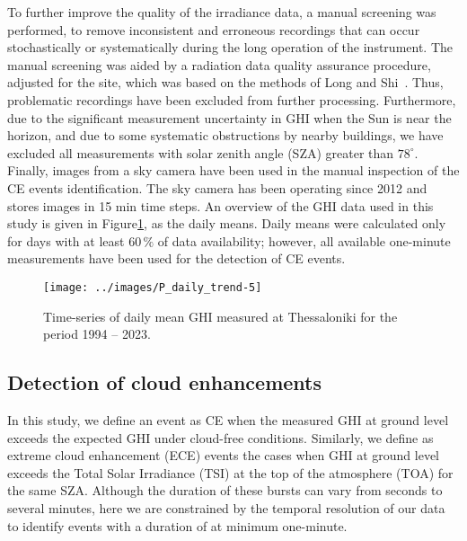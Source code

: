 \documentclass[preprint, 5p,
authoryear]{elsarticle} %
\begin{document}
To further improve the quality of the irradiance data, a manual
screening was performed, to remove inconsistent and erroneous recordings
that can occur stochastically or systematically during the long
operation of the instrument. The manual screening was aided by a
radiation data quality assurance procedure, adjusted for the site, which
was based on the methods of Long and Shi~\citep{Long2006, Long2008a}.
Thus, problematic recordings have been excluded from further processing.
Furthermore, due to the significant measurement uncertainty in GHI when
the Sun is near the horizon, and due to some systematic obstructions by
nearby buildings, we have excluded all measurements with solar zenith
angle (SZA) greater than \(78^\circ\). Finally, images from a sky camera
have been used in the manual inspection of the CE events identification.
The sky camera has been operating since 2012 and stores images in 15 min
time steps. An overview of the GHI data used in this study is given in
Figure\nobreakspace{}\ref{fig:CLB-daily}, as the daily means. Daily
means were calculated only for days with at least \(60\,\%\) of data
availability; however, all available one-minute measurements have been
used for the detection of CE events.

\begin{figure}

{\centering \texttt{[image: ../images/P\_daily\_trend-5]} 

}

\caption{Time-series of daily mean GHI measured at Thessaloniki for the period 1994 -- 2023.}\label{fig:CLB-daily}
\end{figure}

\hypertarget{detection-of-cloud-enhancements}{%
\subsection{Detection of cloud
enhancements}\label{detection-of-cloud-enhancements}}

In this study, we define an event as CE when the measured GHI at ground
level exceeds the expected GHI under cloud-free conditions. Similarly,
we define as extreme cloud enhancement (ECE) events the cases when GHI
at ground level exceeds the Total Solar Irradiance (TSI) at the top of
the atmosphere (TOA) for the same SZA. Although the duration of these
bursts can vary from seconds to several minutes, here we are constrained
by the temporal resolution of our data to identify events with a
duration of at minimum one-minute.
\end{document}
